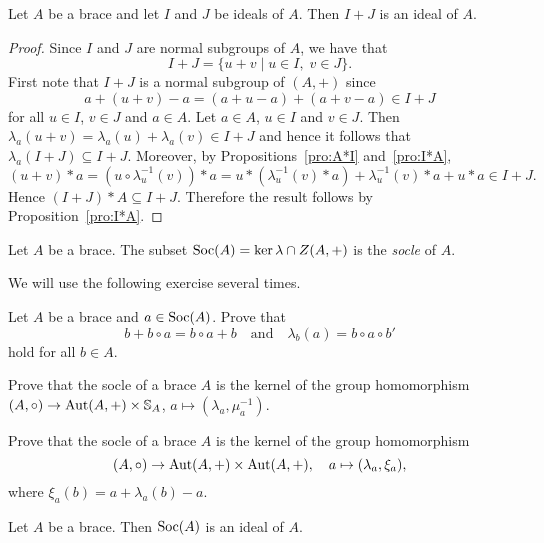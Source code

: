 \begin{proposition}
Let $A$ be a brace and let
$I$ and $J$ be ideals of $A$. Then $I+J$ is an ideal of $A$.
\end{proposition}

\begin{proof}
    Since $I$ and $J$ are normal subgroups of $A$, we have that
    \[ I+J=\{ u+v \mid u\in I,\; v\in J \}.\]
    First note that $I+J$ is a normal subgroup of $(A,+)$ since
    \[
        a+(u+v)-a=(a+u-a)+(a+v-a)\in I+J
    \]
    for all $u\in I$, $v\in J$ and $a\in A$.
    Let $a\in A$, $u\in I$ and $v\in J$. Then $\lambda_a(u+v)=\lambda_a(u)+\lambda_a(v)\in I+J$ and
    hence it follows that $\lambda_a(I+J)\subseteq I+J$. Moreover, by Propositions~\ref{pro:A*I} and~\ref{pro:I*A},
        \[
        (u+v)*a=(u\circ\lambda^{-1}_u(v))*a
        =u*(\lambda^{-1}_u(v)*a)+\lambda^{-1}_u(v)*a+u*a\in I+J.
    \]
    Hence $(I+J)*A\subseteq I+J$. Therefore the result follows by Proposition~\ref{pro:I*A}.
\end{proof}


\begin{definition}
	Let $A$ be a brace. The subset 
	$\operatorname{Soc}(A)=\ker\lambda\cap Z(A,+)$
	is the \emph{socle} of $A$.
\end{definition}

We will use the following exercise several times. 

\begin{exercise}
    \label{xca:socle}
    Let $A$ be a brace and $a\in\operatorname{Soc}(A)$. Prove that  
    \[
    b+b\circ a=b\circ a+b\quad\text{and}\quad
    \lambda_b(a)=b\circ a\circ b'
    \]
    hold 
    for all $b\in A$.
\end{exercise}

\begin{exercise}
\label{xca:Bachiller1}
    Prove that the socle of a brace $A$ is the kernel of the 
    group homomorphism $(A,\circ)\to\operatorname{Aut}(A,+)\times\mathbb{S}_A$, $a\mapsto (\lambda_a,\mu_a^{-1})$. 
\end{exercise}

\begin{exercise}
\label{xca:Bachiller2}
    Prove that the socle of a brace $A$ is the kernel of the 
    group homomorphism 
    \[
    (A,\circ)\to\operatorname{Aut}(A,+)\times\operatorname{Aut}(A,+),
    \quad
    a\mapsto (\lambda_a,\xi_a),
    \]
    where
    $\xi_a(b)=a+\lambda_a(b)-a$. 
\end{exercise}

\begin{proposition}
	\label{pro:socle}
	Let $A$ be a brace. Then $\operatorname{Soc}(A)$ is an ideal of $A$.
\end{proposition}

